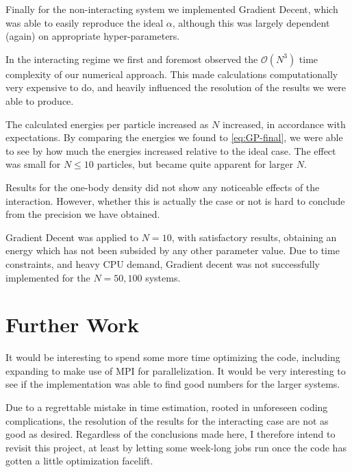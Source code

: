 \documentclass[twocolumn]{article}
\begin{document}
Finally for the non-interacting system we implemented Gradient Decent, which was
able to easily reproduce the ideal $\alpha$, although this was largely dependent
(again) on appropriate hyper-parameters.

In the interacting regime we first and foremost observed the $\mathcal{O}(N^3)$
time complexity of our numerical approach. This made calculations
computationally very expensive to do, and heavily influenced the resolution of
the results we were able to produce. 

The calculated energies per particle increased as $N$ increased, in accordance
with expectations. By comparing the energies we found to \eqref{eq:GP-final}, we
were able to see by how much the energies increased relative to the ideal case.
The effect was small for $N\leq 10$ particles, but became quite apparent for
larger $N$. 

Results for the one-body density did not show any noticeable effects of the
interaction. However, whether this is actually the case or not is hard to
conclude from the precision we have obtained.

Gradient Decent was applied to $N=10$, with satisfactory results, obtaining an
energy which has not been subsided by any other parameter value. Due to time
constraints, and heavy CPU demand, Gradient decent was not successfully
implemented for the $N=50,100$ systems.


\section{Further Work}

It would be interesting to spend some more time optimizing the code, including
expanding to make use of MPI for parallelization. It would be very interesting
to see if the implementation was able to find good numbers for the larger
systems. 

Due to a regrettable mistake in time estimation, rooted in unforeseen coding
complications, the resolution of the results for the interacting case are not as
good as desired. Regardless of the conclusions made here, I therefore intend to
revisit this project, at least by letting some week-long jobs run once the code
has gotten a little optimization facelift. 


\printbibliography
\end{document}
